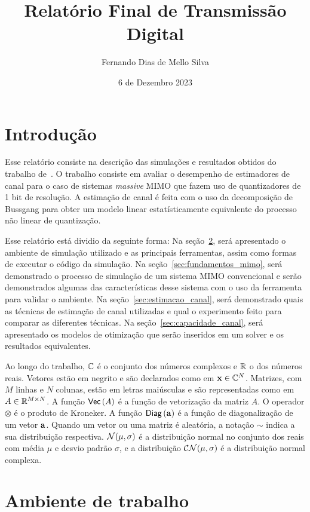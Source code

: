 \documentclass{article}
\title{Relatório Final de Transmissão Digital}
\author{Fernando Dias de Mello Silva}
\date{6 de Dezembro 2023}
\begin{document}
\maketitle

\section{Introdução}

Esse relatório consiste na descrição das simulações e resultados obtidos do trabalho de~\cite{li.etal_2017a}. O trabalho consiste em avaliar o desempenho de estimadores de canal para o caso de sistemas \textit{massive} MIMO que fazem uso de quantizadores de 1 bit de resolução. A estimação de canal é feita com o uso da decomposição de Bussgang para obter um modelo linear estatísticamente equivalente do processo não linear de quantização. 

Esse relatório está dividio da seguinte forma:
Na seção~\ref{sec:ambiente_trabalho}, será apresentado o ambiente de simulação utilizado e as principais ferramentas, assim como formas de executar o código da simulação.
Na seção~\ref{sec:fundamentos_mimo}, será demonstrado o processo de simulação de um sistema MIMO convencional e serão demonstrados algumas das características desse sistema com o uso da ferramenta para validar o ambiente.
Na seção~\ref{sec:estimacao_canal}, será demonstrado quais as técnicas de estimação de canal utilizadas e qual o experimento feito para comparar as diferentes técnicas.
Na seção~\ref{sec:capacidade_canal}, será apresentado os modelos de otimização que serão inseridos em um solver e os resultados equivalentes.

Ao longo do trabalho, $\mathbb{C}$ é o conjunto dos números complexos e $\mathbb{R}$ o dos números reais. Vetores estão em negrito e são declarados como em $\mathbf{x}\in\mathbb{C}^{N}$. Matrizes, com $M$ linhas e $N$ colunas, estão em letras maiúsculas e são representadas como em $A\in\mathbb{R}^{M\times N}$. A função $ \mathsf{Vec} \left( A \right) $ é a função de vetorização da matriz $A$. O operador $\otimes$ é o produto de Kroneker. A função $ \mathsf{Diag} \left( \mathbf{a} \right) $ é a função de diagonalização de um vetor $\mathbf{a}$.  Quando um vetor ou uma matriz é aleatória, a notação $\sim$ indica a sua distribuição respectiva. $\mathcal{N}(\mu,\sigma)$ é a distribuição normal no conjunto dos reais com média $\mu$ e desvio padrão $\sigma$, e a distribuição $\mathcal{C}\mathcal{N}(\mu,\sigma)$ é a distribuição normal complexa. 


\section{Ambiente de trabalho}
\label{sec:ambiente_trabalho}
\end{document}
